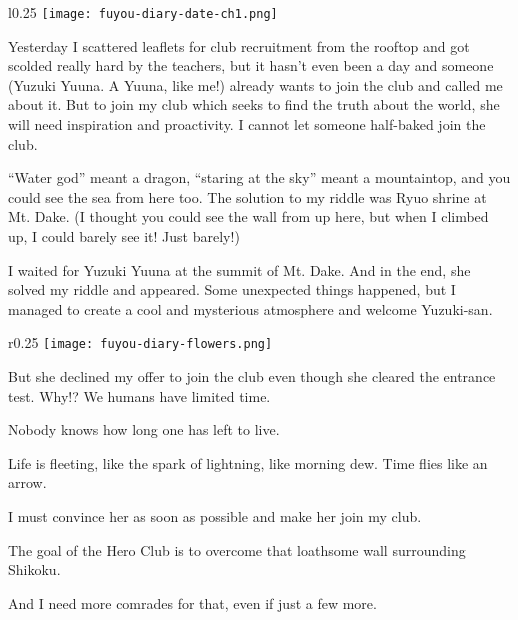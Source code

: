 \begin{center}
\begin{graphpaperBox}[enhanced,box align=center,colframe=diaryborder,width=0.7\textwidth]
\begin{wrapfigure}{l}{0.25\textwidth}
\hspace*{-5mm}\texttt{[image: fuyou-diary-date-ch1.png]}
\end{wrapfigure}

Yesterday I scattered leaflets for club recruitment from the rooftop and got scolded really hard by the teachers, but it hasn't even been a day and someone (Yuzuki Yuuna. A Yuuna, like me!) already wants to join the club and called me about it. But to join my club which seeks to find the truth about the world, she will need inspiration and proactivity. I cannot let someone half-baked join the club.

``Water god'' meant a dragon, ``staring at the sky'' meant a mountaintop, and you could see the sea from here too. The solution to my riddle was Ryuo shrine at Mt. Dake. \textleftarrow{} (I thought you could see the wall from up here, but when I climbed up, I could barely see it! Just barely!)

I waited for Yuzuki Yuuna at the summit of Mt. Dake. And in the end, she solved my riddle and appeared. Some unexpected things happened, but I managed to create a cool and mysterious atmosphere and welcome Yuzuki-san.

\begin{wrapfigure}{r}{0.25\textwidth}
\texttt{[image: fuyou-diary-flowers.png]}
\end{wrapfigure}

But she declined my offer to join the club even though she cleared the entrance test. Why!? We humans have limited time.

Nobody knows how long one has left to live.

Life is fleeting, like the spark of lightning, like morning dew. Time flies like an arrow.

I must convince her as soon as possible and make her join my club.

The goal of the Hero Club is to overcome that loathsome wall surrounding Shikoku.

And I need more comrades for that, even if just a few more.

\end{graphpaperBox}
\end{center}
